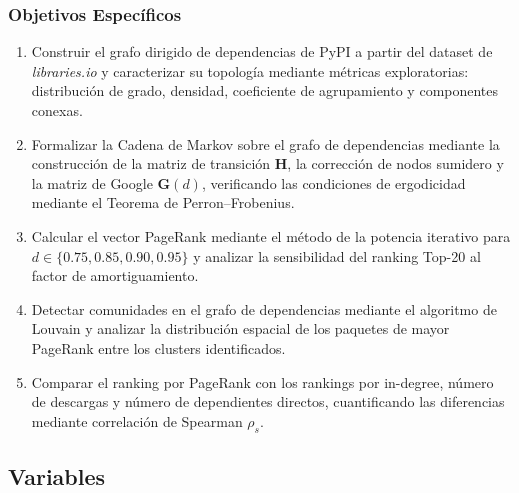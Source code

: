 \subsubsection{Objetivos Específicos}
\begin{enumerate}[label=\textbf{OE\arabic*.}]
    \item Construir el grafo dirigido de dependencias de PyPI a partir del dataset
          de \textit{libraries.io} y caracterizar su topología mediante métricas
          exploratorias: distribución de grado, densidad, coeficiente de
          agrupamiento y componentes conexas.

    \item Formalizar la Cadena de Markov sobre el grafo de dependencias mediante
          la construcción de la matriz de transición $\mathbf{H}$, la corrección
          de nodos sumidero y la matriz de Google $\mathbf{G}(d)$, verificando
          las condiciones de ergodicidad mediante el Teorema de Perron–Frobenius.

    \item Calcular el vector PageRank mediante el método de la potencia iterativo
          para $d \in \{0.75, 0.85, 0.90, 0.95\}$ y analizar la sensibilidad del
          ranking Top-20 al factor de amortiguamiento.

    \item Detectar comunidades en el grafo de dependencias mediante el algoritmo
          de Louvain y analizar la distribución espacial de los paquetes de mayor
          PageRank entre los clusters identificados.

    \item Comparar el ranking por PageRank con los rankings por in-degree,
          número de descargas y número de dependientes directos, cuantificando
          las diferencias mediante correlación de Spearman $\rho_s$.
\end{enumerate}

\subsection{Variables}

